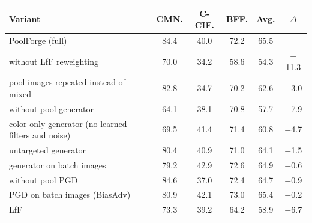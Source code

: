 \begin{tabular}{p{4.2cm}ccccc}
\toprule
Variant & CMN. & C-CIF. & BFF. & Avg. & $\Delta$ \\
\midrule
\rowcolor{ours}PoolForge (full) & 84.4 & 40.0 & 72.2 & 65.5 &  \\
without LfF reweighting & 70.0 & 34.2 & 58.6 & 54.3 & $-$11.3 \\
pool images repeated instead of mixed & 82.8 & 34.7 & 70.2 & 62.6 & $-$3.0 \\
without pool generator & 64.1 & 38.1 & 70.8 & 57.7 & $-$7.9 \\
color-only generator (no learned filters and noise) & 69.5 & 41.4 & 71.4 & 60.8 & $-$4.7 \\
untargeted generator & 80.4 & 40.9 & 71.0 & 64.1 & $-$1.5 \\
generator on batch images & 79.2 & 42.9 & 72.6 & 64.9 & $-$0.6 \\
without pool PGD & 84.6 & 37.0 & 72.4 & 64.7 & $-$0.9 \\
PGD on batch images (BiasAdv) & 80.9 & 42.1 & 73.0 & 65.4 & $-$0.2 \\
LfF & 73.3 & 39.2 & 64.2 & 58.9 & $-$6.7 \\
\bottomrule
\end{tabular}
